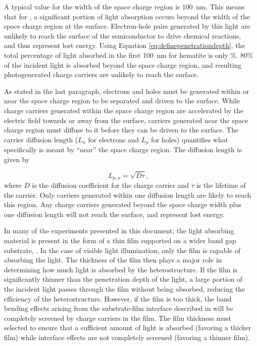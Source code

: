 A typical value for the width of the space charge region is \SI{100}{\nano\meter}. This means that for , a significant portion of light absorption occurs beyond the width of the space charge region at the surface. Electron-hole pairs generated by this light are unlikely to reach the surface of the semiconductor to drive chemical reactions, and thus represent lost energy. Using Equation \ref{eq:definepenetrationdepth}, the total percentage of light absorbed in the first \SI{100}{\nano\meter} for hematite is only \%. 80\% of the incident light is absorbed beyond the space charge region, and resulting photogenerated charge carriers are unlikely to reach the surface.

As stated in the last paragraph, electrons and holes must be generated within or near the space charge region to be separated and driven to the surface. While charge carriers generated within the space charge region are accelerated by the electric field towards or away from the surface, carriers generated near the space charge region must diffuse to it before they can be driven to the surface.  The carrier diffusion length ($L_{n}$ for electrons and $L_{p}$ for holes) quantifies what specifically is meant by ``near'' the space charge region. The diffusion length is given by

\begin{equation}
	\label{fig:diffusionlength}
	L_{p,n}=\sqrt{D\tau},
\end{equation}
where $D$ is the diffusion coefficient for the charge carrier and $\tau$ is the lifetime of the carrier. Only carriers generated within one diffusion length are likely to reach this region. Any charge carriers generated beyond the space charge width plus one diffusion length will not reach the surface, and represent lost energy. 

In many of the experiments presented in this document, the light absorbing  material is present in the form of a thin film supported on a wider band gap substrate, . In the case of visible light illumination, only the film is capable of absorbing the light. The thickness of the film then plays a major role in determining how much light is absorbed by the heterostructure. If the film is significantly thinner than the penetration depth of the light, a large portion of the incident light passes through the film without being absorbed, reducing the efficiency of the heterostructure. However, if the film is too thick, the band bending effects arising from the substrate-film interface described in  will be completely screened by charge carriers in the film. The film thickness must selected to ensure that a sufficient amount of light is absorbed (favoring a thicker film) while interface effects are not completely screened (favoring a thinner film).


